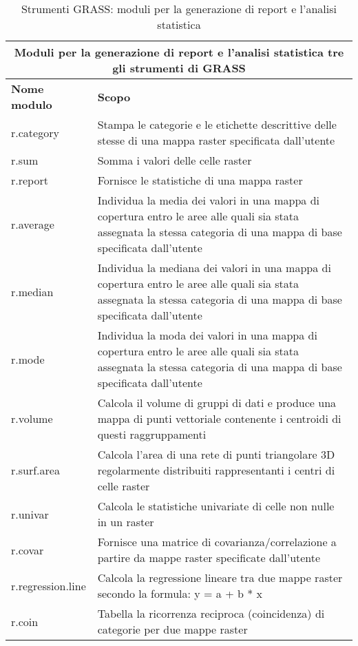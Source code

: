 \begin{table}[ht]
\centering
\caption{Strumenti GRASS: moduli per la generazione di report e l'analisi statistica}\medskip
 \begin{tabular}{|p{4cm}|p{12cm}|}
  \hline \multicolumn{2}{|c|}{\textbf{Moduli per la generazione di report e l'analisi statistica tre gli strumenti di GRASS}} \\
  \hline \textbf{Nome modulo} & \textbf{Scopo} \\
  \hline r.category & Stampa le categorie e le etichette descrittive delle stesse di una mappa raster specificata dall'utente \\
  \hline r.sum & Somma i valori delle celle raster \\
  \hline r.report & Fornisce le statistiche di una mappa raster \\
  \hline r.average & Individua la media dei valori in una mappa di copertura entro le aree alle quali sia stata assegnata la stessa categoria di una mappa di base specificata dall'utente \\
  \hline r.median & Individua la mediana dei valori in una mappa di copertura entro le aree alle quali sia stata assegnata la stessa categoria di una mappa di base specificata dall'utente \\
  \hline r.mode & Individua la moda dei valori in una mappa di copertura entro le aree alle quali sia stata assegnata la stessa categoria di una mappa di base specificata dall'utente  \\
  \hline r.volume & Calcola il volume di gruppi di dati e produce una mappa di punti vettoriale contenente i centroidi di questi raggruppamenti \\
  \hline r.surf.area & Calcola l'area di una rete di punti triangolare 3D regolarmente distribuiti rappresentanti i centri di celle raster \\
  \hline r.univar & Calcola le statistiche univariate di celle non nulle in un raster \\
  \hline r.covar & Fornisce una matrice di covarianza/correlazione a partire da mappe raster specificate dall'utente \\
  \hline r.regression.line & Calcola la regressione lineare tra due mappe raster secondo la formula: y = a + b * x \\
  \hline r.coin & Tabella la ricorrenza reciproca (coincidenza) di categorie per due mappe raster \\
\hline
\end{tabular}
\end{table}

